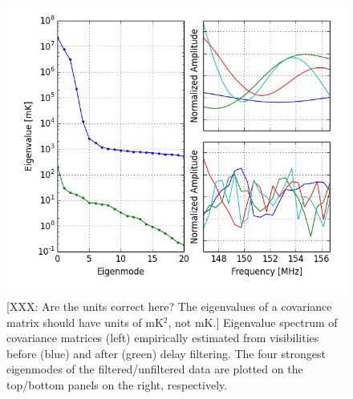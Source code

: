 \documentclass[twocolumn,numberedappendix]{emulateapj} \shorttitle{New Limits on the 21 cm Power Spectrum at $z=8.4$}
\begin{document}
\begin{figure}\centering
\includegraphics[width=\columnwidth]{plots/eig.png}
\caption{
[XXX: Are the units correct here? The eigenvalues of a covariance matrix should
have units of mK$^2$, not mK.]
Eigenvalue spectrum of covariance matrices (left) empirically estimated 
from visibilities before (blue) and after (green) delay filtering.
The four strongest eigenmodes of the filtered/unfiltered data are plotted
on the top/bottom panels on the right, respectively.
} \label{fig:eigs}
\end{figure}
\end{document}
